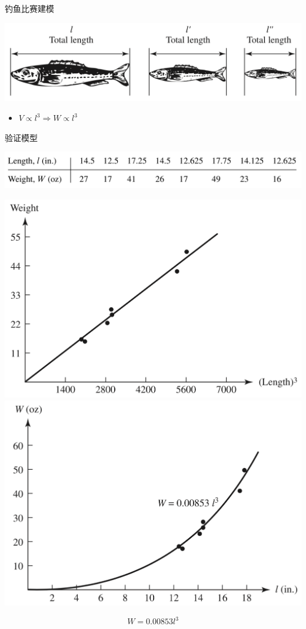 \documentclass[UTF8]{ctexbeamer}
\begin{document}
\begin{frame}{钓鱼比赛建模}
  \begin{center}
    \includegraphics[width=.8\textwidth{}]{fish.png}
  \end{center}

  \begin{itemize}
  \item $V \propto l^3 \Rightarrow W \propto l^3$
  \end{itemize}
\end{frame}

\begin{frame}{验证模型}
  \begin{center}
    \includegraphics[width=.8\textwidth{}]{fishtab.png}
  \end{center}

  \begin{center}
    \includegraphics[width=.4\textwidth{}]{fishlen1.png}
    \includegraphics[width=.4\textwidth{}]{fishlen2.png}
  \end{center}
  \[
  W = 0.00853l^3
  \]
\end{frame}
\end{document}

